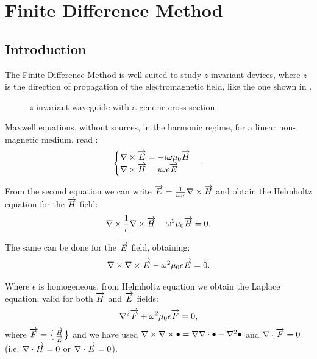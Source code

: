 \chapter{Finite Difference Method} 

\section{Introduction} \label{sec:fdm_intro}

The Finite Difference Method is well suited to study $z$-invariant
devices, where $z$ is the direction of propagation of the
electromagnetic field, like the one shown in .

\begin{figure}[htbp]
  \begin{center}
    \resizebox{6cm}{!}{}
  \end{center}
  \caption{$z$-invariant waveguide with a generic cross section.}
  \label{fig:fdm_waveguide}
\end{figure}

Maxwell equations, without sources, in the harmonic regime, for a
linear non-magnetic medium, read \cite{someda_electromagnetic}:
\begin{equation} \label{eqn:fdm_maxwell} \begin{cases}
    {\nabla\times \overrightarrow{E}} = -\imath \omega \mu_0 \overrightarrow{H} \\
    {\nabla \times \overrightarrow{H}} = \imath \omega \epsilon \overrightarrow{E}
\end{cases} . \end{equation}

From the second equation we can write $\overrightarrow{E} = \frac{1}{\imath
\omega \epsilon} {\nabla \times \overrightarrow{H}}$ and obtain the Helmholtz
equation for the $\overrightarrow{H}$ field:
\begin{equation} \label{eqn:fdm_helmholtz_h}
  {\nabla\times \frac{1}{\epsilon} {\nabla\times \overrightarrow{H}}} - \omega^2 \mu_0 \overrightarrow{H} = 0.
\end{equation}

The same can be done for the $\overrightarrow{E}$ field, obtaining:
\begin{equation} \label{eqn:fdm_helmholtz_e}
  {\nabla\times {\nabla\times \overrightarrow{E}}} - \omega^2 \mu_0 \epsilon \overrightarrow{E} = 0.
\end{equation}

Where $\epsilon$ is homogeneous, from Helmholtz equation we obtain the
Laplace equation, valid for both $\overrightarrow{H}$ and $\overrightarrow{E}$ fields:
\begin{equation} \label{eqn:fdm_laplace}
  {\nabla^2 \overrightarrow{F}} + \omega^2 \mu_0 \epsilon \overrightarrow{F} = 0,
\end{equation}
where $\overrightarrow{F} = \bigl\{ \begin{smallmatrix} \overrightarrow{H} \\ \overrightarrow{E} \end{smallmatrix}
\bigr\}$ and we have used ${\nabla \times {\nabla\times \bullet}} = {\nabla {\nabla\cdot \bullet}} -
{\nabla^2 \bullet}$ and ${\nabla \cdot \overrightarrow{F}} = 0$ (i.e. ${\nabla \cdot \overrightarrow{H}} = 0$ or
${\nabla \cdot \overrightarrow{E}} = 0$).

